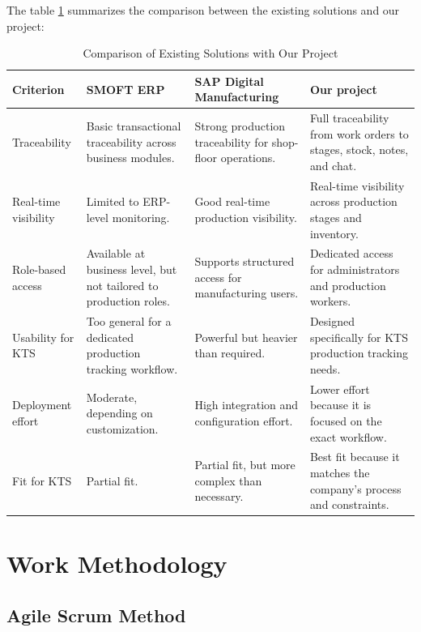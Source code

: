 The table \ref{tab:comparison} summarizes the comparison between the existing solutions and our project:
\begin{table}[H]
    \centering
    \caption{Comparison of Existing Solutions with Our Project} \label{tab:comparison}
    \renewcommand{\arraystretch}{1.2}
    \small
    \begin{tabularx}{\textwidth}{|p{3.6cm}|>{\raggedright\arraybackslash}X|>{\raggedright\arraybackslash}X|>{\raggedright\arraybackslash}X|}
        \hline
        \textbf{Criterion} & \textbf{SMOFT ERP} & \textbf{SAP Digital Manufacturing} & \textbf{Our project} \\
        \hline
        Traceability & Basic transactional traceability across business modules. & Strong production traceability for shop-floor operations. & Full traceability from work orders to stages, stock, notes, and chat. \\
        \hline
        Real-time visibility & Limited to ERP-level monitoring. & Good real-time production visibility. & Real-time visibility across production stages and inventory. \\
        \hline
        Role-based access & Available at business level, but not tailored to production roles. & Supports structured access for manufacturing users. & Dedicated access for administrators and production workers. \\
        \hline
        Usability for KTS & Too general for a dedicated production tracking workflow. & Powerful but heavier than required. & Designed specifically for KTS production tracking needs. \\
        \hline
        Deployment effort & Moderate, depending on customization. & High integration and configuration effort. & Lower effort because it is focused on the exact workflow. \\
        \hline
        Fit for KTS & Partial fit. & Partial fit, but more complex than necessary. & Best fit because it matches the company's process and constraints. \\
        \hline
    \end{tabularx}
\end{table}



\section{Work Methodology}

\subsection{Agile Scrum Method}

